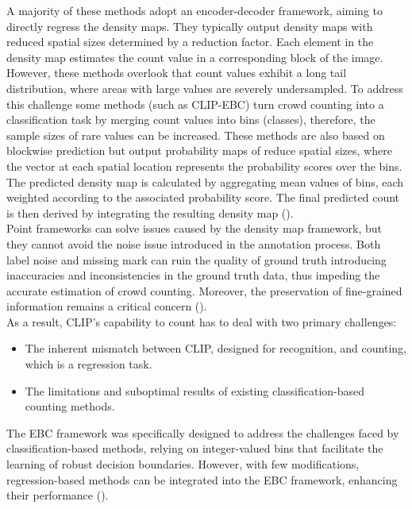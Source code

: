 A majority of these methods adopt an encoder-decoder framework, aiming to directly regress the density maps. They typically output density maps with reduced spatial sizes determined by a reduction factor. Each element in the density map estimates the count value in a corresponding block of the image. However, these methods overlook that count values exhibit a long tail distribution, where areas with large values are severely undersampled. To address this challenge some methods (such as CLIP-EBC) turn crowd counting into a classification task by merging count values into bins (classes), therefore, the sample sizes of rare values can be increased. These methods are also based on blockwise prediction but output probability maps of reduce spatial sizes, where the vector at each spatial location represents the probability scores over the bins. The predicted density map is calculated by aggregating mean values of bins, each weighted according to the associated probability score. The final predicted count is then derived by integrating the resulting density map (\cite{CLIP}).\\

Point frameworks can solve issues caused by the density map framework, but they cannot avoid the noise issue introduced in the annotation process. Both label noise and missing mark can ruin the quality of ground truth introducing inaccuracies and inconsistencies in the ground truth data, thus impeding the accurate estimation of crowd counting. Moreover, the preservation of fine-grained information remains a critical concern (\cite{FGENet}).\\

As a result, CLIP's capability to count has to deal with two primary challenges:
\begin{itemize}
    \item The inherent mismatch between CLIP, designed for recognition, and counting, which is a regression task.
    \item The limitations and suboptimal results of existing classification-based counting methods.
\end{itemize}
The EBC framework was specifically designed to address the challenges faced by classification-based methods, relying on integer-valued bins that facilitate the learning of robust decision boundaries. However, with few modifications, regression-based methods can be integrated into the EBC framework, enhancing their performance (\cite{CLIP}).\\

